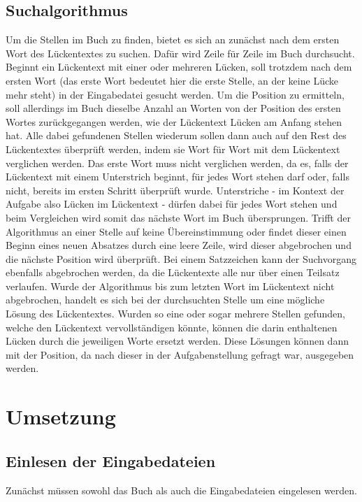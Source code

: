 \documentclass[a4paper, 10pt, ngerman]{scrartcl}
\begin{document}
\subsection{Suchalgorithmus}\label{sec:suchalgorithmus}
Um die Stellen im Buch zu finden,
bietet es sich an zunächst nach dem ersten Wort des Lückentextes zu suchen.
Dafür wird Zeile für Zeile im Buch durchsucht.
Beginnt ein Lückentext mit einer oder mehreren Lücken,
soll trotzdem nach dem ersten Wort
(das erste Wort bedeutet hier die erste Stelle,
an der keine Lücke mehr steht)
in der Eingabedatei gesucht werden.
Um die Position zu ermitteln,
soll allerdings im Buch dieselbe Anzahl an Worten von der Position des ersten Wortes zurückgegangen werden,
wie der Lückentext Lücken am Anfang stehen hat.
Alle dabei gefundenen Stellen wiederum sollen dann auch auf den Rest des Lückentextes überprüft werden,
indem sie Wort für Wort mit dem Lückentext verglichen werden.
Das erste Wort muss nicht verglichen werden,
da es,
falls der Lückentext mit einem Unterstrich beginnt,
für jedes Wort stehen darf
oder,
falls nicht,
bereits im ersten Schritt überprüft wurde.
Unterstriche
- im Kontext der Aufgabe also Lücken im Lückentext -
dürfen dabei für jedes Wort stehen
und beim Vergleichen wird somit das nächste Wort im Buch übersprungen.
Trifft der Algorithmus an einer Stelle auf keine Übereinstimmung
oder findet dieser einen Beginn eines neuen Absatzes durch eine leere Zeile,
wird dieser abgebrochen
und die nächste Position wird überprüft.
Bei einem Satzzeichen kann der Suchvorgang ebenfalls abgebrochen werden,
da die Lückentexte alle nur über einen Teilsatz verlaufen.
Wurde der Algorithmus bis zum letzten Wort im Lückentext nicht abgebrochen,
handelt es sich bei der durchsuchten Stelle um eine mögliche Lösung des Lückentextes.
Wurden so eine oder sogar mehrere Stellen gefunden,
welche den Lückentext vervollständigen könnte,
können die darin enthaltenen Lücken durch die jeweiligen Worte ersetzt werden.
Diese Lösungen können dann mit der Position,
da nach dieser in der Aufgabenstellung gefragt war,
ausgegeben werden.


\section{Umsetzung}\label{sec:umsetzung}
\subsection{Einlesen der Eingabedateien}
Zunächst müssen sowohl das Buch als auch die Eingabedateien eingelesen werden.
\end{document}
